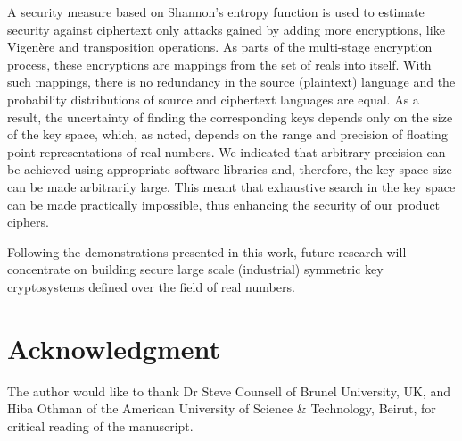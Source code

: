 \documentclass[10pt,journal]{IEEEtran}
\begin{document}
A security measure based on Shannon's entropy function is used to estimate
security against ciphertext only attacks gained by adding more encryptions, 
like Vigen\`ere and transposition operations. As parts of the multi-stage encryption 
process, these encryptions are mappings from the set of reals  into 
itself. With such mappings, there is no redundancy in the source (plaintext) 
language and the probability distributions of source and ciphertext languages are 
equal. As a result, the uncertainty of finding the corresponding keys depends 
only on the size of the key space, which, as noted, depends on the range 
and precision of floating point representations of real numbers. We indicated 
that arbitrary precision can be achieved using appropriate software libraries and, therefore, the key space size can be made arbitrarily large. This meant
that exhaustive search in the key space can be made practically impossible, thus enhancing the security of our product ciphers.
\newline

Following the demonstrations presented in this work, future research will concentrate 
on building secure large scale (industrial) symmetric key cryptosystems defined over the field of real numbers.   

\section*{Acknowledgment}
The author would like to thank Dr Steve Counsell of Brunel University, UK, and Hiba Othman of the American University of Science \& Technology, Beirut, for critical reading of the manuscript.
\end{document}
